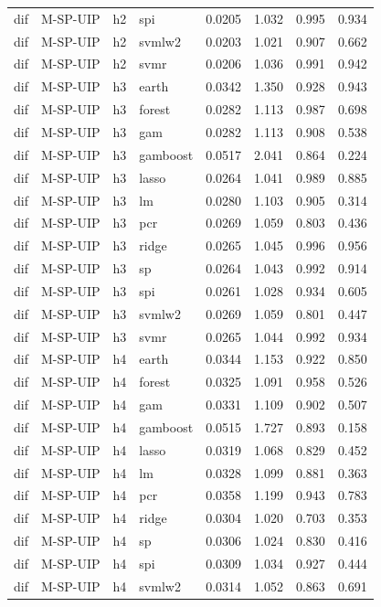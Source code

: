 \begin{ThreePartTable}
\begin{longtable}[t]{llclcccc}
dif & M-SP-UIP & h2 & spi & 0.0205 & 1.032 & 0.995 & 0.934\\
dif & M-SP-UIP & h2 & svmlw2 & 0.0203 & 1.021 & 0.907 & 0.662\\
dif & M-SP-UIP & h2 & svmr & 0.0206 & 1.036 & 0.991 & 0.942\\
\addlinespace
dif & M-SP-UIP & h3 & earth & 0.0342 & 1.350 & 0.928 & 0.943\\
dif & M-SP-UIP & h3 & forest & 0.0282 & 1.113 & 0.987 & 0.698\\
dif & M-SP-UIP & h3 & gam & 0.0282 & 1.113 & 0.908 & 0.538\\
dif & M-SP-UIP & h3 & gamboost & 0.0517 & 2.041 & 0.864 & 0.224\\
dif & M-SP-UIP & h3 & lasso & 0.0264 & 1.041 & 0.989 & 0.885\\
dif & M-SP-UIP & h3 & lm & 0.0280 & 1.103 & 0.905 & 0.314\\
dif & M-SP-UIP & h3 & pcr & 0.0269 & 1.059 & 0.803 & 0.436\\
dif & M-SP-UIP & h3 & ridge & 0.0265 & 1.045 & 0.996 & 0.956\\
dif & M-SP-UIP & h3 & sp & 0.0264 & 1.043 & 0.992 & 0.914\\
dif & M-SP-UIP & h3 & spi & 0.0261 & 1.028 & 0.934 & 0.605\\
dif & M-SP-UIP & h3 & svmlw2 & 0.0269 & 1.059 & 0.801 & 0.447\\
dif & M-SP-UIP & h3 & svmr & 0.0265 & 1.044 & 0.992 & 0.934\\
\addlinespace
dif & M-SP-UIP & h4 & earth & 0.0344 & 1.153 & 0.922 & 0.850\\
dif & M-SP-UIP & h4 & forest & 0.0325 & 1.091 & 0.958 & 0.526\\
dif & M-SP-UIP & h4 & gam & 0.0331 & 1.109 & 0.902 & 0.507\\
dif & M-SP-UIP & h4 & gamboost & 0.0515 & 1.727 & 0.893 & 0.158\\
dif & M-SP-UIP & h4 & lasso & 0.0319 & 1.068 & 0.829 & 0.452\\
dif & M-SP-UIP & h4 & lm & 0.0328 & 1.099 & 0.881 & 0.363\\
dif & M-SP-UIP & h4 & pcr & 0.0358 & 1.199 & 0.943 & 0.783\\
dif & M-SP-UIP & h4 & ridge & 0.0304 & 1.020 & 0.703 & 0.353\\
dif & M-SP-UIP & h4 & sp & 0.0306 & 1.024 & 0.830 & 0.416\\
dif & M-SP-UIP & h4 & spi & 0.0309 & 1.034 & 0.927 & 0.444\\
dif & M-SP-UIP & h4 & svmlw2 & 0.0314 & 1.052 & 0.863 & 0.691\\

\end{longtable}
\end{ThreePartTable}
